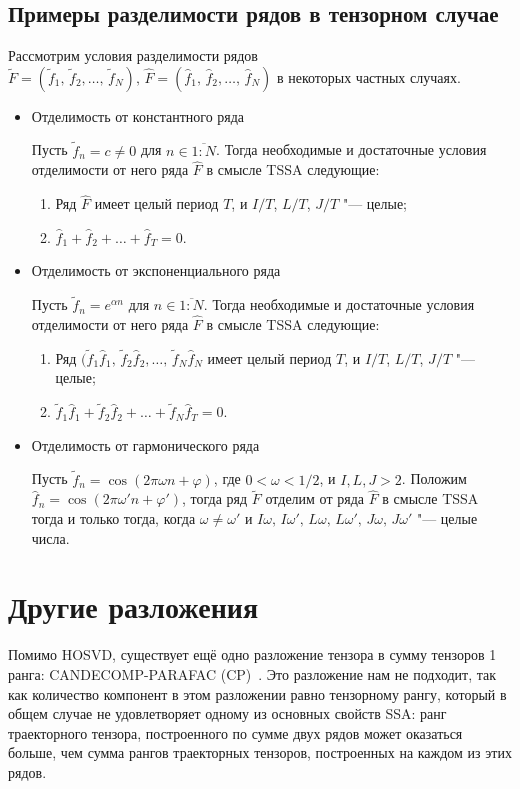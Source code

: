 \documentclass[specialist,
    substylefile = spbu_report.rtx,
    subf,href,colorlinks=true, 12pt]{disser}
\theoremstyle{plain}
\theoremstyle{definition}
\theoremstyle{remark}
\begin{document}
    \subsection{Примеры разделимости рядов в тензорном случае}\label{subsec:separation-example}
    Рассмотрим условия разделимости рядов $\tilde{F}=(\tilde{f}_{1},\, \tilde{f}_{2},\ldots,\, \tilde{f}_{N}),\, \hat{F}=
    (\hat{f}_{1},\, \hat{f}_{2},\ldots,\, \hat{f}_{N})$ в некоторых частных случаях.
    \begin{itemize}
        \item Отделимость от константного ряда

        Пусть $\tilde{f}_n=c\ne 0$ для $n\in\overline{1:N}$.
        Тогда необходимые и достаточные условия отделимости от него ряда $\hat{F}$ в смысле TSSA следующие:
        \begin{enumerate}
            \item Ряд $\hat{F}$ имеет целый период $T$, и $I/T$, $L/T$, $J/T$ "--- целые;
            \item $\hat{f}_{1}+\hat{f}_2+\ldots+\hat{f}_T=0$.
        \end{enumerate}
        \item Отделимость от экспоненциального ряда

        Пусть $\tilde{f}_n=e^{\alpha n}$ для $n\in\overline{1:N}$.
        Тогда необходимые и достаточные условия отделимости от него ряда $\hat{F}$ в смысле TSSA следующие:
        \begin{enumerate}
            \item Ряд $(\tilde{f}_{1}\hat{f}_{1},\, \tilde{f}_{2}\hat{f}_{2},\ldots,\, \tilde{f}_{N}\hat{f}_{N}$
            имеет целый период $T$, и $I/T$, $L/T$, $J/T$ "--- целые;
            \item $\tilde{f}_{1}\hat{f}_{1}+\tilde{f}_{2}\hat{f}_2+\ldots+\tilde{f}_{N}\hat{f}_T=0$.
        \end{enumerate}
        \item Отделимость от гармонического ряда

        Пусть $\tilde{f}_n=\cos(2\pi \omega n + \varphi)$, где $0 < \omega < 1/2$, и $I, L, J > 2$.
        Положим $\hat{f}_n=\cos(2\pi \omega' n + \varphi')$,
        тогда ряд $\tilde{F}$ отделим от ряда $\hat{F}$ в смысле TSSA тогда и только тогда, когда $\omega\ne\omega'$
        и $I\omega,\, I\omega',\, L\omega,\, L\omega',\, J\omega,\, J\omega'$ "--- целые числа.
    \end{itemize}


    \section{Другие разложения}\label{sec:other-decomp}
    Помимо HOSVD, существует ещё одно разложение тензора в сумму тензоров 1 ранга: CANDECOMP-PARAFAC
    (CP)~\cite{parafac1, parafac2}.
    Это разложение нам не подходит, так как количество компонент в этом разложении равно тензорному рангу, который
    в общем случае не удовлетворяет одному из основных свойств SSA: ранг траекторного тензора, построенного по
    сумме двух рядов может оказаться больше, чем сумма рангов траекторных тензоров, построенных на каждом из этих рядов.
\end{document}
